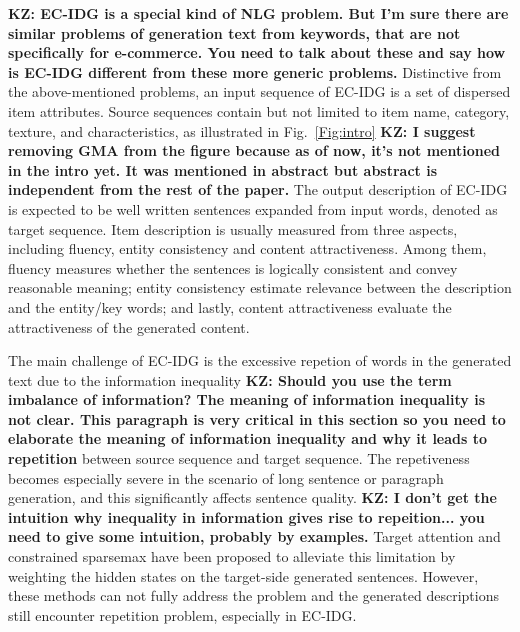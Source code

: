 \documentclass[letterpaper]{article} %
\newcommand{\KZ}[1]{{\bf \color{red} KZ: #1}}
\begin{document}
\KZ{EC-IDG is a special kind of NLG problem. But I'm sure there are similar
problems of generation text from keywords, that are not specifically for
e-commerce. You need to talk about these and say how is EC-IDG different from
these more generic problems.}
Distinctive from the above-mentioned problems, an input sequence of EC-IDG is a set of dispersed item attributes. %
Source sequences contain but not limited to item name, category, texture, and characteristics, as illustrated in Fig.~\ref{Fig:intro}
\KZ{I suggest removing GMA from the figure because as of now, it's not mentioned
in the intro yet. It was mentioned in abstract but abstract is independent
from the rest of the paper.}
The output description of EC-IDG is expected to be well written sentences 
expanded from input words, denoted as target sequence.
Item description is usually measured from three aspects, including fluency, entity consistency and content attractiveness.
Among them, fluency measures whether the sentences is logically consistent and convey reasonable meaning; 
entity consistency estimate relevance between the description and the entity/key words; 
and lastly, content attractiveness evaluate the attractiveness of the generated content.

The main challenge of EC-IDG is the excessive repetion of words in
the generated text due to the information inequality \KZ{Should you use
the term imbalance of information? The meaning of information inequality is
not clear. This paragraph is very critical in this section so you need to
elaborate the meaning of information inequality and why it leads to 
repetition} between source sequence and target sequence.
The repetiveness becomes especially severe in the scenario of 
long sentence or paragraph generation, and this significantly affects 
sentence quality. \KZ{I don't get the intuition why inequality
in information gives rise to repeition... you need to give some intuition,
probably by examples.}
Target attention \cite{xia2017sequence} and constrained sparsemax \cite{malaviya2018sparse} have been proposed to alleviate this limitation by weighting the hidden states on the target-side generated sentences.
However, these methods can not fully address the problem and the generated descriptions still encounter repetition problem, especially in EC-IDG.
\end{document}
